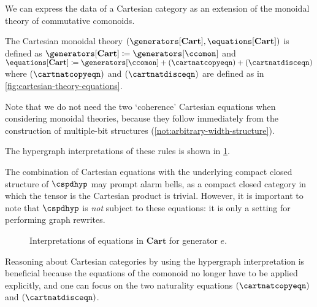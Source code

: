 We can express the data of a Cartesian category as an extension of the
monoidal theory of commutative comonoids.

\begin{definition}
    The Cartesian monoidal theory \(
    (\generators[\mathbf{Cart}], \equations[\mathbf{Cart}])
    \) is defined as \(
    \generators[\mathbf{Cart}] \coloneqq \generators[\ccomon]
    \) and \(
    \equations[\mathbf{Cart}]
    \coloneqq
    \generators[\ccomon] + (\cartnatcopyeqn) + (\cartnatdisceqn)
    \) where \((\cartnatcopyeqn)\) and \((\cartnatdisceqn)\) are defined as in
    \cref{fig:cartesian-theory-equations}.
\end{definition}

\begin{remark}
    Note that we do not need the two `coherence' Cartesian equations when
    considering monoidal theories, because they follow immediately from the
    construction of multiple-bit structures
    (\cref{not:arbitrary-width-structure}).
\end{remark}



The hypergraph interpretations of these rules is shown in
\cref{fig:cartesian-graphs}.

\begin{remark}
    The combination of Cartesian equations with the underlying compact closed
    structure of \(\cspdhyp\) may prompt alarm bells, as a compact closed
    category in which the tensor is the Cartesian product is trivial.
    However, it is important to note that \(\cspdhyp\) is \emph{not} subject to
    these equations: it is only a setting for performing graph
    rewrites.
\end{remark}

\begin{figure}
    \centering
    
    \qquad
    \raisebox{1em}{}
    \caption{
        Interpretations of equations in \(\mathbf{Cart}\) for
        generator \(e\).
    }
    \label{fig:cartesian-graphs}
\end{figure}

Reasoning about Cartesian categories by using the hypergraph interpretation is
beneficial because the equations of the comonoid no longer have to be applied
explicitly, and one can focus on the two naturality equations
\((\cartnatcopyeqn)\) and \((\cartnatdisceqn)\).

